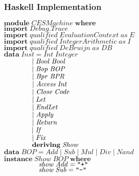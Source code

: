 \documentclass[10pt]{article}
\newcommand{\Conid}[1]{\mathit{#1}}
\newcommand{\Varid}[1]{\mathit{#1}}
\begin{document}
\subsubsection{Haskell Implementation}
\begin{hscode}\SaveRestoreHook
${\mathbf{module}\;\Conid{CESMachine}\;\mathbf{where}}$\\
${\mathbf{import}\;\Conid{\Conid{Debug}.Trace}}$\\
${\mathbf{import}\;\Varid{qualified}\;\Conid{EvaluationContext}\;\Varid{as}\;\Conid{E}}$\\
${\mathbf{import}\;\Varid{qualified}\;\Conid{IntegerArithmetic}\;\Varid{as}\;\Conid{I}}$\\
${\mathbf{import}\;\Varid{qualified}\;\Conid{DeBruijn}\;\Varid{as}\;\Conid{DB}}$\\
${}$\\
${\mathbf{data}\;\Conid{Inst}\mathrel{=}\Conid{Int}\;\Conid{Integer}}$\\
${\hskip4.00em\relax\mid \Conid{Bool}\;\Conid{Bool}}$\\
${\hskip4.00em\relax\mid \Conid{Bop}\;\Conid{BOP}}$\\
${\hskip4.00em\relax\mid \Conid{Bpr}\;\Conid{BPR}}$\\
${\hskip4.00em\relax\mid \Conid{Access}\;\Conid{Int}}$\\
${\hskip4.00em\relax\mid \Conid{Close}\;\Conid{Code}}$\\
${\hskip4.00em\relax\mid \Conid{Let}}$\\
${\hskip4.00em\relax\mid \Conid{EndLet}}$\\
${\hskip4.00em\relax\mid \Conid{Apply}}$\\
${\hskip4.00em\relax\mid \Conid{Return}}$\\
${\hskip4.00em\relax\mid \Conid{If}}$\\
${\hskip4.00em\relax\mid \Conid{Fix}}$\\
${\hskip4.00em\relax\mathbf{deriving}\;\Conid{Show}}$\\
${}$\\
${\mathbf{data}\;\Conid{BOP}\mathrel{=}\Conid{Add}\mid \Conid{Sub}\mid \Conid{Mul}\mid \Conid{Div}\mid \Conid{Nand}}$\\
${\mathbf{instance}\;\Conid{Show}\;\Conid{BOP}\;\mathbf{where}}$\\
${\hskip5.00em\relax\Varid{show}\;\Conid{Add}\mathrel{=}\text{\tt \char34 +\char34}}$\\
${\hskip5.00em\relax\Varid{show}\;\Conid{Sub}\mathrel{=}\text{\tt \char34 -\char34}}$\\

\end{hscode}
\end{document}

